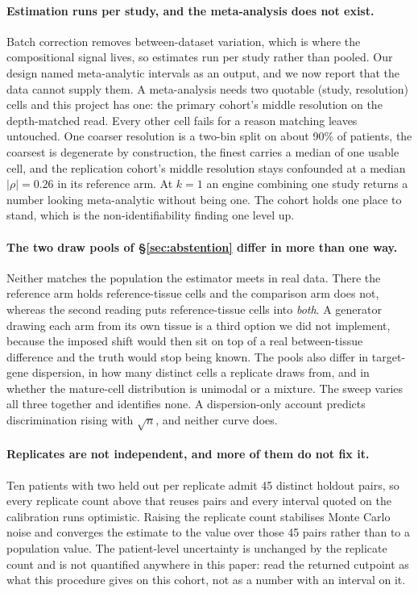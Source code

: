 \paragraph{Estimation runs per study, and the meta-analysis does not exist.}
Batch correction removes between-dataset variation, which is where the
compositional signal lives, so estimates run per study rather than pooled. Our
design named meta-analytic intervals as an output, and we now report that the
data cannot supply them. A meta-analysis needs two quotable (study, resolution)
cells and this project has one: the primary cohort's middle resolution on the
depth-matched read. Every other cell fails for a reason matching leaves
untouched. One coarser resolution is a two-bin split on about 90\% of patients,
the coarsest is degenerate by construction, the finest carries a median of one
usable cell, and the replication cohort's middle resolution stays confounded at
a median $|\rho| = 0.26$ in its reference arm. At $k = 1$ an engine combining
one study returns a number looking meta-analytic without being one. The cohort
holds one place to stand, which is the non-identifiability finding one level
up.

\paragraph{The two draw pools of \S\ref{sec:abstention} differ in more than one
way.} Neither matches the population the estimator meets in real data. There
the reference arm holds reference-tissue cells and the comparison arm does not,
whereas the second reading puts reference-tissue cells into \emph{both}. A
generator drawing each arm from its own tissue is a third option we did not
implement, because the imposed shift would then sit on top of a real
between-tissue difference and the truth would stop being known. The pools also
differ in target-gene dispersion, in how many distinct cells a replicate draws
from, and in whether the mature-cell distribution is unimodal or a mixture. The
sweep varies all three together and identifies none. A dispersion-only account
predicts discrimination rising with $\sqrt{n}$, and neither curve does.

\paragraph{Replicates are not independent, and more of them do not fix it.} Ten
patients with two held out per replicate admit 45 distinct holdout pairs, so
every replicate count above that reuses pairs and every interval quoted on the
calibration runs optimistic. Raising the replicate count stabilises Monte Carlo
noise and converges the estimate to the value over those 45 pairs rather than
to a population value. The patient-level uncertainty is unchanged by the
replicate count and is not quantified anywhere in this paper: read the returned
cutpoint as what this procedure gives on this cohort, not as a number with an
interval on it.

